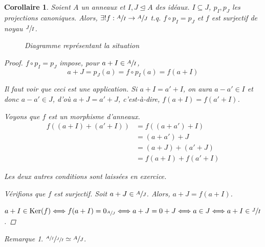 \documentclass{report}
\newtheorem*{coro}{Corollaire}
\theoremstyle{definition}
\theoremstyle{remark}
\newtheorem*{rmq}{Remarque}
\def\noyau{\operatorname{Ker}}
\begin{document}
	\begin{coro}
		Soient $A$ un anneaux et $I,J\trianglelefteq A$ des id\'eaux. $I\subseteq J$, $p_I,p_J$ les projections canoniques. Alors, $\exists!f:\sfrac{A}{I}\to\sfrac{A}{J}$ t.q. $f\circ p_I=p_J$ et $f$ est surjectif de noyau $\sfrac{J}{I}$.

		\begin{figure}[h]
			\centering
			\caption{Diagramme repr\'esentant la situation}
		\end{figure}

		\begin{proof}
			$f\circ p_I=p_J$ impose, pour $a+I\in\sfrac{A}{I}$, \[ a+J = p_J(a) = f\circ p_I(a) = f(a+I) \]

			Il faut voir que ceci est une application. Si $a+I=a'+I$, on aura $a-a'\in I$ et donc $a-a'\in J$, d'o\`u $a+J=a'+J$, c'est-\`a-dire, $f(a+I)=f(a'+I)$.

			Voyons que $f$ est un morphisme d'anneaux.
			\begin{align*}
				f((a+I)+(a'+I))&= f((a+a')+I)\\
				&= (a+a')+J\\
				&= (a+J)+(a'+J)\\
				&= f(a+I)+f(a'+I)
			\end{align*}

			Les deux autres conditions sont laiss\'ees en exercice.

			V\'erifions que $f$ est surjectif. Soit $a+J\in \sfrac{A}{J}$. Alors, $a+J = f(a+I)$.

			$a+I\in\noyau(f) \Longleftrightarrow f(a+I) = 0_{\sfrac{A}{J}} \Longleftrightarrow a+J=0+J \Longleftrightarrow a\in J \Longleftrightarrow a+I\in\sfrac{J}{I}$.
		\end{proof}
	\end{coro}

	\begin{rmq}
		$\sfrac{\sfrac{A}{I}}{\sfrac{J}{I}} \simeq \sfrac{A}{J}$.
	\end{rmq}
\end{document}

